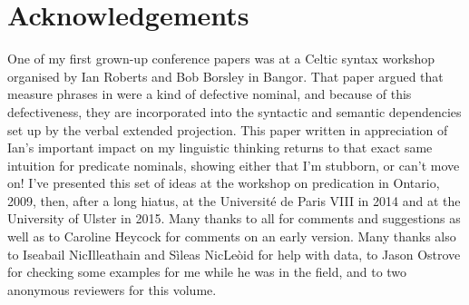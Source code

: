 \documentclass[output=paper]{langsci/langscibook}
\begin{document}
\printchapterglossary{}

\section*{Acknowledgements}

One of my first grown-up conference papers was at a Celtic syntax workshop
organised by Ian Roberts and Bob Borsley in Bangor. That paper argued that
measure phrases in  were a kind of defective nominal, and
because of this defectiveness, they are incorporated into the syntactic and
semantic dependencies set up by the verbal extended projection. This paper
written in appreciation of Ian's important impact on my linguistic thinking
returns to that exact same intuition for predicate nominals, showing either
that I'm stubborn, or can't move on! I've presented this set of ideas at the
workshop on predication in Ontario, 2009,  then, after a long hiatus, at the
Universit\'e de Paris VIII in 2014 and at the University of Ulster in 2015. Many
thanks to all for comments and suggestions as well as to Caroline Heycock for
comments on an early version. Many thanks also to Iseabail NicIlleathain and
S\`ileas NicLe\`oid for help with data, to Jason Ostrove for checking some
examples for me while he was in the field, and to two anonymous reviewers for
this volume.

{\sloppy
\printbibliography[heading=subbibliography,notkeyword=this]
}
\end{document}
